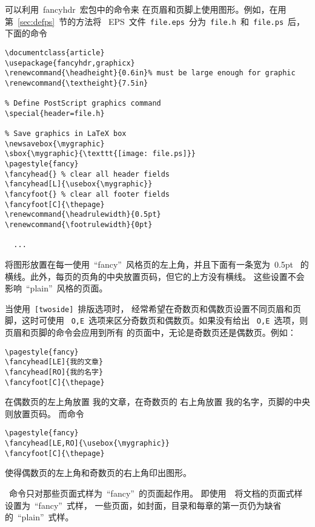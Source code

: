 可以利用~\textsf{fancyhdr}~宏包中的命令来
在页眉和页脚上使用图形。例如，在用第~\ref{sec:defps}~节的方法将
~EPS~文件~\texttt{file.eps}~分为~\texttt{file.h}~和~\texttt{file.ps}~后，
下面的命令
\begin{Verbatim}
\documentclass{article}
\usepackage{fancyhdr,graphicx}
\renewcommand{\headheight}{0.6in}% must be large enough for graphic
\renewcommand{\textheight}{7.5in}

% Define PostScript graphics command
\special{header=file.h}

% Save graphics in LaTeX box
\newsavebox{\mygraphic}
\sbox{\mygraphic}{\texttt{[image: file.ps]}}
\pagestyle{fancy}
\fancyhead{} % clear all header fields
\fancyhead[L]{\usebox{\mygraphic}}
\fancyfoot{} % clear all footer fields
\fancyfoot[C]{\thepage}
\renewcommand{\headrulewidth}{0.5pt}
\renewcommand{\footrulewidth}{0pt}

  ...

\end{Verbatim}
将图形放置在每一使用~``fancy''~风格页的左上角，并且下面有一条宽为~0.5pt~
的横线。此外，每页的页角的中央放置页码，但它的上方没有横线。
这些设置不会影响~``plain''~风格的页面。

当使用~\texttt{[twoside]}~排版选项时，
经常希望在奇数页和偶数页设置不同页眉和页脚，这时可使用
~\texttt{O,E}~选项来区分奇数页和偶数页。如果没有给出
~\texttt{O,E}~选项，则页眉和页脚的命令会应用到所有
的页面中，无论是奇数页还是偶数页。例如：
\begin{Verbatim}[xleftmargin=1cm]
\pagestyle{fancy}
\fancyhead[LE]{我的文章}
\fancyhead[RO]{我的名字}
\fancyfoot[C]{\thepage}
\end{Verbatim}
在偶数页的左上角放置{ 我的文章}，在奇数页的
右上角放置{ 我的名字}，页脚的中央则放置页码。
而命令
\begin{Verbatim}[xleftmargin=1cm]
\pagestyle{fancy}
\fancyhead[LE,RO]{\usebox{\mygraphic}}
\fancyfoot[C]{\thepage}
\end{Verbatim}
使得偶数页的左上角和奇数页的右上角印出图形。

~命令只对那些页面式样为~``fancy''~的页面起作用。
即使用~~将文档的页面式样设置为~``fancy''~式样，
一些页面，如封面，目录和每章的第一页仍为缺省的~``plain''~式样。


